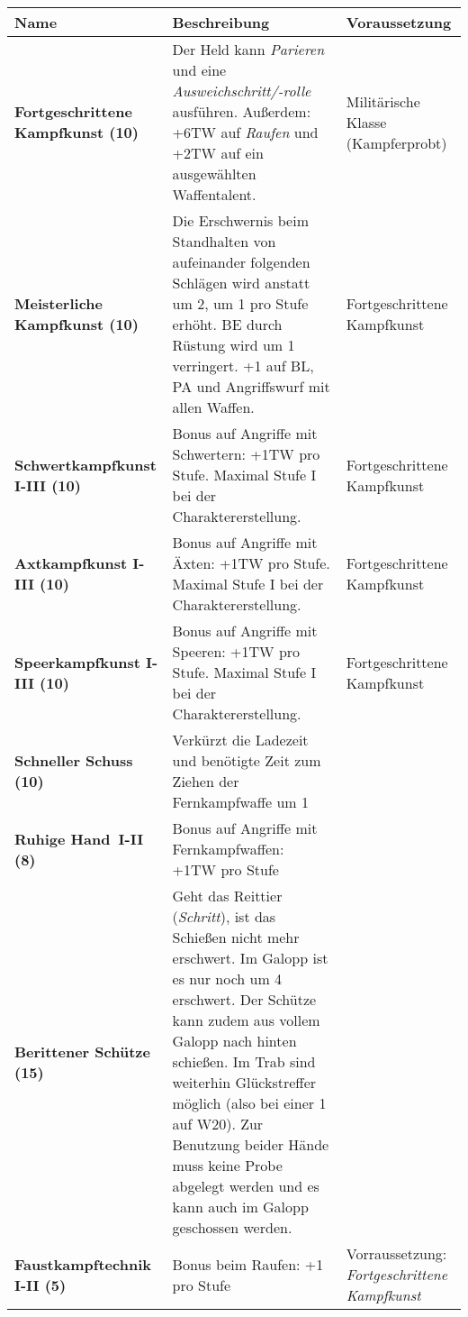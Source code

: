 \begin{longtable}{| p{4cm} | p{8cm} | p{3cm} |}
\hline
\textbf{Name} & \textbf{Beschreibung} & \textbf{Voraussetzung} \\

\hline
\textbf{Fortgeschrittene Kampfkunst (10)} & Der Held kann \textit{Parieren} und eine \textit{Ausweichschritt/-rolle} ausführen. Außerdem: +6TW auf \textit{Raufen} und +2TW auf ein ausgewählten Waffentalent. & Militärische Klasse (Kampferprobt) \\

\hline 
\textbf{Meisterliche Kampfkunst (10)} & Die Erschwernis beim Standhalten von aufeinander folgenden Schlägen wird anstatt um 2, um 1 pro Stufe erhöht. BE durch Rüstung wird um 1 verringert. +1 auf BL, PA und Angriffswurf mit allen Waffen. & Fortgeschrittene Kampfkunst \\

\hline
\textbf{Schwertkampfkunst I-III (10)} & Bonus auf Angriffe mit Schwertern: +1TW pro Stufe. Maximal Stufe I bei der Charaktererstellung. & Fortgeschrittene Kampfkunst \\

\hline
\textbf{Axtkampfkunst I-III (10)} & Bonus auf Angriffe mit Äxten: +1TW pro Stufe. Maximal Stufe I bei der Charaktererstellung. & Fortgeschrittene Kampfkunst \\

\hline
\textbf{Speerkampfkunst I-III (10)} & Bonus auf Angriffe mit Speeren: +1TW pro Stufe. Maximal Stufe I bei der Charaktererstellung. & Fortgeschrittene Kampfkunst \\

\hline
\textbf{Schneller Schuss (10)} & Verkürzt die Ladezeit und benötigte Zeit zum Ziehen der Fernkampfwaffe um 1 & \\

\hline
\textbf{Ruhige Hand~I-II (8)} & Bonus auf Angriffe mit Fernkampfwaffen: +1TW pro Stufe & \\

\hline
\textbf{Berittener Schütze (15)} & Geht das Reittier (\textit{Schritt}), ist das Schießen nicht mehr erschwert. Im Galopp ist es nur noch um 4 erschwert. Der Schütze kann zudem aus vollem Galopp nach hinten schießen. Im Trab sind weiterhin Glückstreffer möglich (also bei einer 1 auf W20). Zur Benutzung beider Hände muss keine Probe abgelegt werden und es kann auch im Galopp geschossen werden. & \\

\hline
\textbf{Faustkampftechnik I-II (5)} & Bonus beim Raufen: +1 pro Stufe & Vorraussetzung: \textit{Fortgeschrittene Kampfkunst} \\


\end{longtable}
